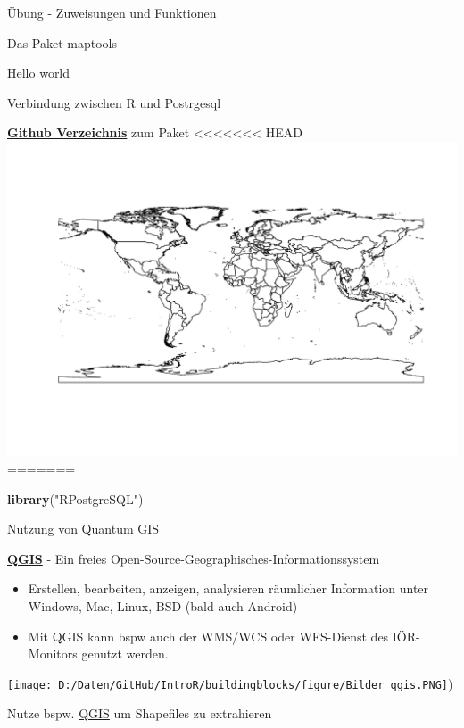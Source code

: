 \documentclass[ignorenonframetext,]{beamer}
\newenvironment{Shaded}{\begin{snugshade}}{\end{snugshade}}
\newcommand{\KeywordTok}[1]{\textcolor[rgb]{0.26,0.66,0.93}{\textbf{#1}}}
\newcommand{\NormalTok}[1]{\textcolor[rgb]{0.74,0.68,0.62}{#1}}
\newcommand{\StringTok}[1]{\textcolor[rgb]{0.02,0.61,0.04}{#1}}
\providecommand{\tightlist}{%
  \setlength{\itemsep}{0pt}\setlength{\parskip}{0pt}}
\begin{document}
\begin{frame}[fragile]{Übung - Zuweisungen und Funktionen}
\begin{frame}[fragile]{Das Paket maptools}
\begin{frame}[fragile]{Hello world}
\begin{frame}[fragile]{Verbindung zwischen R und Postrgesql}
\begin{block}{\href{https://github.com/tomoakin/RPostgreSQL}{\textbf{Github
Verzeichnis}} zum Paket}
<<<<<<< HEAD
\includegraphics{Geomedizin_files/figure-beamer/unnamed-chunk-62-1.pdf}
=======
\begin{Shaded}
\begin{Highlighting}[]
\KeywordTok{library}\NormalTok{(}\StringTok{"RPostgreSQL"}\NormalTok{)}
\end{Highlighting}
\end{Shaded}

\end{block}

\end{frame}

\begin{frame}{Nutzung von Quantum GIS}

\begin{block}{\href{https://www.qgis.org/de/site/}{\textbf{QGIS}} - Ein
freies Open-Source-Geographisches-Informationssystem}

\begin{itemize}
\tightlist
\item
  Erstellen, bearbeiten, anzeigen, analysieren räumlicher Information
  unter Windows, Mac, Linux, BSD (bald auch Android)
\item
  Mit QGIS kann bspw auch der WMS/WCS oder WFS-Dienst des IÖR-Monitors
  genutzt werden.
\end{itemize}

\texttt{[image: D:/Daten/GitHub/IntroR/buildingblocks/figure/Bilder\_qgis.PNG]})

\end{block}

\end{frame}

\begin{frame}{Nutze bspw. \href{http://www.qgis.org/de/site/}{QGIS} um
Shapefiles zu extrahieren}


\end{frame}
\end{frame}
\end{frame}
\end{frame}
\end{document}
